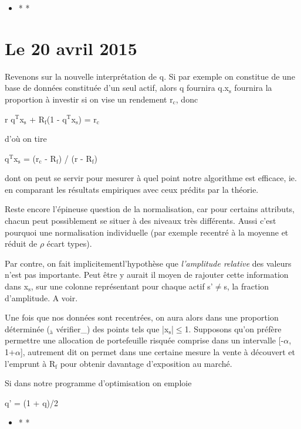 \documentclass[11pt]{article}
\begin{document}
\begin{itemize}
\item * *
\end{itemize}


\section{\textbf{Le 20 avril 2015}}
\label{sec-2}

Revenons sur la nouvelle interprétation de q. Si par exemple on constitue de une base de
données constituée d'un seul actif, alors q fournira q.x$_{\text{s}}$ fournira la proportion à
investir si on vise un rendement r$_{\text{c}}$, donc

r q$^{\text{T}}$x$_{\text{s}}$ + R$_{\text{f}}$(1 - q$^{\text{T}}$x$_{\text{s}}$) = r$_{\text{c}}$

d'où on tire

q$^{\text{T}}$x$_{\text{s}}$ = (r$_{\text{c}}$ - R$_{\text{f}}$) / (r - R$_{\text{f}}$)

dont on peut se servir pour mesurer à quel point notre algorithme est efficace, ie. en
comparant les résultats empiriques avec ceux prédits par la théorie. 

Reste encore l'épineuse question de la normalisation, car pour certains attributs, chacun
peut possiblement se situer à des niveaux très différents. Aussi c'est pourquoi une
normalisation individuelle (par exemple recentré à la moyenne et réduit de $\rho$ écart types).

Par contre, on fait implicitementl'hypothèse que \emph{l'amplitude relative} des valeurs n'est
pas importante. Peut être y aurait il moyen de rajouter cette information dans x$_{\text{s}}$, sur une
colonne représentant pour chaque actif s'$\neq$s, la fraction d'amplitude. A voir. 

Une fois que nos données sont recentrées, on aura alors dans une proportion déterminée ($_{\text{à}}$
vérifier\_) des points tels que |x$_{\text{s}}$|$\le$1. Supposons qu'on préfère permettre une allocation
de portefeuille risquée comprise dans un intervalle [-$\alpha$, 1+$\alpha$], autrement dit on permet
dans une certaine mesure la vente à découvert et l'emprunt à R$_{\text{f}}$ pour obtenir davantage
d'exposition au marché. 

Si dans notre programme d'optimisation on emploie

q' = (1 + q)/2

\begin{itemize}
\item * *
\end{itemize}
\end{document}
